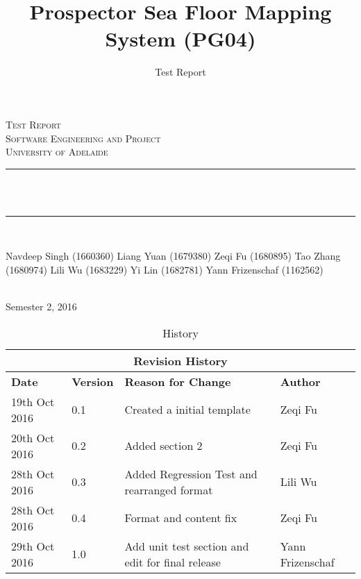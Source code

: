 \documentclass[12pt]{article}
\title{Prospector Sea Floor Mapping System (PG04)}
\author{Test Report}
\makeatletter
\let\thetitle\@title
\makeatother
\begin{document}

\begin{titlepage}
	\centering
    \vspace*{0.0 cm}
    \textsc{\LARGE Test Report}\\[2.0 cm]
	\textsc{\Large Software Engineering and Project}\\[0.5 cm]			
	\textsc{\large University of Adelaide}\\[0.5 cm]
	\rule{\linewidth}{0.2 mm} \\[0.4 cm]
	{ \huge \bfseries \thetitle}\\
	\rule{\linewidth}{0.2 mm} \\[1.5 cm]
	
	\begin{minipage}{0.4\textwidth}
		\begin{center} \large
			Navdeep Singh (1660360)\linebreak
			Liang Yuan (1679380)\linebreak
			Zeqi Fu (1680895)\linebreak
			Tao Zhang (1680974)\linebreak
			Lili Wu (1683229)\linebreak
			Yi Lin (1682781)\linebreak
            Yann Frizenschaf (1162562)\linebreak
			\end{center}
	\end{minipage}\\[2 cm]
	
	{\large Semester 2, 2016}\\[2 cm]
 
	\vfill
	
\end{titlepage}


\begin{table}[H]
\begin{tabular}{ | p{}| p{}| p{}|p{}| }
\hline
\multicolumn{4}{|c|}{\textbf{Revision History}}\\
\hline
\textbf \textbf{Date} &  \textbf\textbf{Version} &  \textbf\textbf{Reason for Change} &  \textbf\textbf{Author}  \\
\hline
19th Oct 2016 & 0.1 & Created a initial template & Zeqi Fu\\
\hline
20th Oct 2016 & 0.2 & Added section 2  & Zeqi Fu\\
\hline
28th Oct 2016 & 0.3 & Added Regression Test and rearranged format & Lili Wu\\
\hline
28th Oct 2016 & 0.4 & Format and content fix & Zeqi Fu\\
\hline
29th Oct 2016 & 1.0 & Add unit test section and edit for final release & Yann Frizenschaf\\
\hline
\end{tabular}
\caption{ History}
\end{table} 
\end{document}
